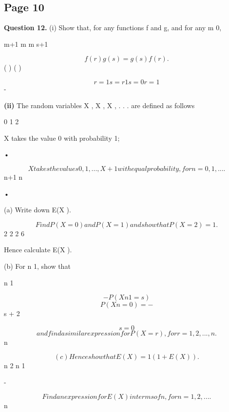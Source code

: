 \documentclass[12pt]{article}
\begin{document}
\subsection*{Page 10}
\begin{flushleft}
\bigskip\textbf{Question 12.} (i) Show that, for any functions f and g, and for any m  0,\par
m+1 m m s+1\par
\[f(r) g(s) = g(s) f(r) .\]
( ) ( )\par
\[r=1 s=r 1 s=0 r=1\]
-\par
\textbf{(ii)} The random variables X , X , X , . . . are defined as follows\par
0 1 2\par
X takes the value 0 with probability 1;\par
•\par
\[X takes the values 0, 1, . . . , X + 1 with equal probability, for n = 0, 1, . . . .\]
n+1 n\par
•\par
(a) Write down E(X ).\par
\[Find P(X = 0) and P(X = 1) and show that P(X = 2) = 1 .\]
2 2 2 6\par
Hence calculate E(X ).\par
(b) For n  1, show that\par
n 1\par
\[- P(X n 1 = s)\]
\[P(X n = 0) = -\]
s + 2\par
\[s=0\]
\[and find a similar expression for P(X = r), for r = 1, 2, . . . , n.\]
n\par
\[(c) Hence show that E(X ) = 1 (1 + E(X )).\]
n 2 n 1\par
-\par
\[Find an expression for E(X ) in terms of n, for n = 1, 2, . . . .\]
n\par
\end{flushleft}
\end{document}
